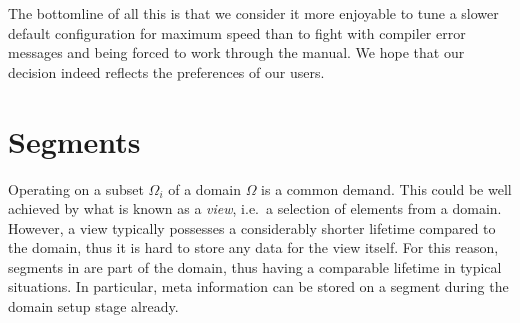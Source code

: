  The bottomline of all this is that we consider it more enjoyable to tune a slower default configuration for maximum speed than to fight with compiler error messages and being forced to work through the manual. We hope that our decision indeed reflects the preferences of our users.


 \section{Segments}
 Operating on a subset $\Omega_i$ of a domain $\Omega$ is a common demand. This could be well achieved by what is known as a \emph{view}, i.e.~a selection of elements from a domain. However, a view typically possesses a considerably shorter lifetime compared to the domain, thus it is hard to store any data for the view itself.
 For this reason, segments in {\ViennaGrid} are part of the domain, thus having a comparable lifetime in typical situations.
 In particular, meta information can be stored on a segment during the domain setup stage already.
